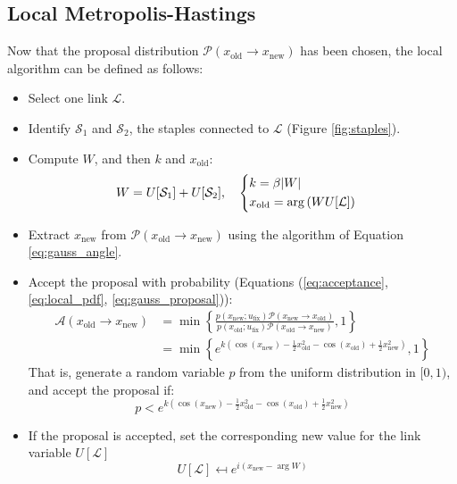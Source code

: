 \subsection*{Local Metropolis-Hastings}
Now that the proposal distribution $\mathcal P(x_\mathrm{old}\to x_\mathrm{new})$ has been chosen,
the local algorithm can be defined as follows:
\begin{itemize}
    \item Select one link $\mathcal L$.
    \item Identify $\mathcal S_1$ and $\mathcal S_2$, the staples connected to $\mathcal L$ (Figure \ref{fig:staples}).
    \item Compute $W$, and then $k$ and $x_\mathrm{old}$:
        \[\begin{aligned}
            &W = U[\mathcal S_1] + U[\mathcal S_2],
            &
            &\begin{dcases}
                k = \beta |W| \\
                x_\mathrm{old} = \arg\left(WU[\mathcal L]\right)
            \end{dcases}
        \end{aligned}\]
    \item Extract $x_\mathrm{new}$ from $\mathcal P(x_\mathrm{old}\to x_\mathrm{new})$ using the algorithm of Equation \eqref{eq:gauss_angle}.
    \item Accept the proposal with probability (Equations (\ref{eq:acceptance}, \ref{eq:local_pdf}, \ref{eq:gauss_proposal})):
        \[\begin{aligned}
            \mathcal A(x_\mathrm{old}\to x_\mathrm{new})
                 &=  \min\left\{\frac{p(x_\mathrm{new};u_\mathrm{fix})\mathcal P(x_\mathrm{new}\to x_\mathrm{old})}
                                     {p(x_\mathrm{old};u_\mathrm{fix})\mathcal P(x_\mathrm{old}\to x_\mathrm{new})},1\right\} \\[.5em]
                 &= \min\left\{e^{k\left(\cos(x_\mathrm{new})-\frac{1}{2}x_\mathrm{old}^2-\cos(x_\mathrm{old})+\frac{1}{2}x_\mathrm{new}^2\right)},1\right\}
        \end{aligned}\]
        That is, generate a random variable $p$ from the uniform distribution in $[0,1)$,
        and accept the proposal if:
        \[
            p < e^{k\left(\cos(x_\mathrm{new})-\frac{1}{2}x_\mathrm{old}^2-\cos(x_\mathrm{old})+\frac{1}{2}x_\mathrm{new}^2\right)}
        \]
    \item If the proposal is accepted, set the corresponding new value for the link variable $U[\mathcal L]$
        \[
            U[\mathcal L] \mapsfrom e^{i(x_\mathrm{new}-\arg W)}
        \]
\end{itemize}

